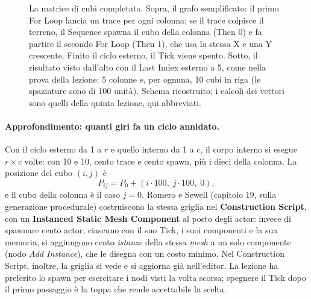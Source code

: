 \begin{figure}[htbp]
\caption{La matrice di cubi completata. Sopra, il grafo semplificato: il primo For Loop
lancia un trace per ogni colonna; se il trace colpisce il terreno, il Sequence spawna il
cubo della colonna (Then 0) e fa partire il secondo For Loop (Then 1), che usa la stessa X
e una Y crescente. Finito il ciclo esterno, il Tick viene spento. Sotto, il risultato
visto dall'alto con il Last Index esterno a 5, come nella prova della lezione: 5 colonne
e, per ognuna, 10 cubi in riga (le spaziature sono di 100 unità). Schema ricostruito; i
calcoli dei vettori sono quelli della quinta lezione, qui abbreviati.}
\label{ue6:fig:griglia}
\end{figure}

\paragraph{Approfondimento: quanti giri fa un ciclo annidato.} Con il ciclo esterno da 1
a $r$ e quello interno da 1 a $c$, il corpo interno si esegue $r \times c$ volte: con
10 e 10, cento trace e cento spawn, più i dieci della colonna. La posizione del cubo
$(i, j)$ è
\[
  P_{ij} = P_0 + (i \cdot 100,\; j \cdot 100,\; 0),
\]
e il cubo della colonna è il caso $j = 0$. Romero e Sewell (capitolo 19, sulla
generazione procedurale) costruiscono la stessa griglia nel \textbf{Construction
Script}, con un \textbf{Instanced Static Mesh Component} al posto degli actor: invece di
spawnare cento actor, ciascuno con il suo Tick, i suoi componenti e la sua memoria, si
aggiungono cento \emph{istanze} della stessa \emph{mesh} a un solo componente (nodo
\emph{Add Instance}), che le disegna con un costo minimo. Nel Construction Script,
inoltre, la griglia si vede e si aggiorna già nell'editor. La lezione ha preferito lo
spawn per esercitare i nodi visti la volta scorsa; spegnere il Tick dopo il primo
passaggio è la toppa che rende accettabile la scelta.

